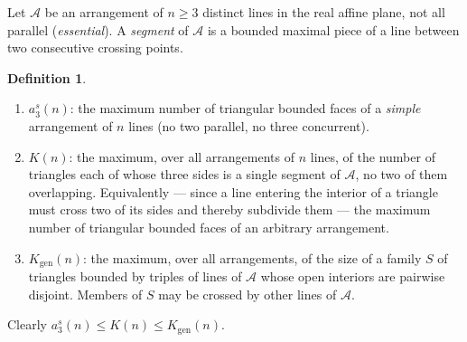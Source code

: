 \documentclass[11pt]{article}
\theoremstyle{definition}
\newtheorem{definition}[theorem]{Definition}
\newcommand{\Kgen}{K_{\mathrm{gen}}}
\begin{document}
Let $\mathcal A$ be an arrangement of $n\ge3$ distinct lines in the real
affine plane, not all parallel (\emph{essential}). A \emph{segment} of
$\mathcal A$ is a bounded maximal piece of a line between two consecutive
crossing points.

\begin{definition}\label{def:three}
\begin{enumerate}
\item[(i)] $a_3^s(n)$: the maximum number of triangular bounded faces of a
\emph{simple} arrangement of $n$ lines (no two parallel, no three
concurrent).
\item[(ii)] $K(n)$: the maximum, over all arrangements of $n$ lines, of the
number of triangles each of whose three sides is a single segment of
$\mathcal A$, no two of them overlapping. Equivalently --- since a line
entering the interior of a triangle must cross two of its sides and thereby
subdivide them --- the maximum number of triangular bounded faces of an
arbitrary arrangement.
\item[(iii)] $\Kgen(n)$: the maximum, over all arrangements, of the size of a
family $S$ of triangles bounded by triples of lines of $\mathcal A$ whose
open interiors are pairwise disjoint. Members of $S$ may be crossed by other
lines of $\mathcal A$.
\end{enumerate}
Clearly $a_3^s(n)\le K(n)\le \Kgen(n)$.
\end{definition}
\end{document}
